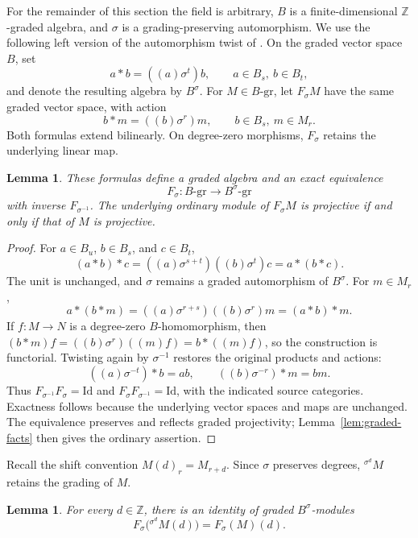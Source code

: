 \documentclass[10pt,a4paper]{amsart}
\numberwithin{equation}{section}
\newtheorem{lemma}[definition]{Lemma}
\newcommand{\Z}{\mathbb Z}
\newcommand{\gmod}[1]{#1\text{-}\mathrm{gr}}
\newcommand{\tw}[2]{{}^{#1}\!#2}
\newcommand{\Id}{\mathrm{Id}}
\begin{document}
For the remainder of this section the field is arbitrary, \(B\) is a
finite-dimensional \(\Z\)-graded algebra, and \(\sigma\) is a
grading-preserving automorphism. We use the following left version of
the automorphism twist of \cite{Zhang96}. On the graded vector space
\(B\), set
\begin{equation*}
 a*b=((a)\sigma^t)b,
 \qquad a\in B_s,\ b\in B_t,
\end{equation*}
and denote the resulting algebra by \(B^\sigma\).
For \(M\in\gmod{B}\), let \(F_\sigma M\) have the same graded vector
space, with action
\begin{equation*}
 b*m=((b)\sigma^r)m,
 \qquad b\in B_s,\ m\in M_r.
\end{equation*}
Both formulas extend bilinearly. On degree-zero morphisms,
\(F_\sigma\) retains the underlying linear map.

\begin{lemma}\label{lem:twist-equivalence}
These formulas define a graded algebra and an exact equivalence
\[
 F_\sigma:\gmod{B}\longrightarrow\gmod{B^\sigma}
\]
with inverse \(F_{\sigma^{-1}}\). The underlying ordinary module of
\(F_\sigma M\) is projective if and only if that of \(M\) is projective.
\end{lemma}

\begin{proof}
For \(a\in B_u\), \(b\in B_s\), and \(c\in B_t\),
\[
 (a*b)*c=((a)\sigma^{s+t})((b)\sigma^t)c=a*(b*c).
\]
The unit is unchanged, and \(\sigma\) remains a graded automorphism
of \(B^\sigma\). For \(m\in M_r\),
\[
 a*(b*m)=((a)\sigma^{r+s})((b)\sigma^r)m=(a*b)*m.
\]
If \(f:M\to N\) is a degree-zero \(B\)-homomorphism, then
\((b*m)f=((b)\sigma^r)((m)f)=b*((m)f)\), so the construction is
functorial. Twisting again by \(\sigma^{-1}\) restores the original
products and actions:
\[
 ((a)\sigma^{-t})*b=ab,
 \qquad ((b)\sigma^{-r})*m=bm.
\]
Thus \(F_{\sigma^{-1}}F_\sigma=\Id\) and
\(F_\sigma F_{\sigma^{-1}}=\Id\), with the indicated source categories.
Exactness follows because the underlying vector spaces and maps are
unchanged. The equivalence preserves and reflects graded projectivity;
Lemma~\ref{lem:graded-facts} then gives the ordinary assertion.
\end{proof}

Recall the shift convention \(M(d)_r=M_{r+d}\). Since \(\sigma\)
preserves degrees, \(\tw{\sigma^d}{M}\) retains the grading of \(M\).

\begin{lemma}\label{lem:shift-twist}
For every \(d\in\Z\), there is an identity of graded
\(B^\sigma\)-modules
\begin{equation*}
 F_\sigma\bigl(\tw{\sigma^d}{M}(d)\bigr)=F_\sigma(M)(d).
\end{equation*}
\end{lemma}
\end{document}

